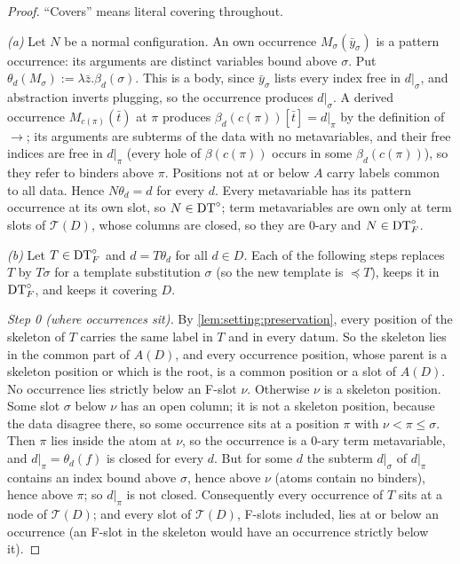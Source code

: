 \begin{proof}
``Covers'' means literal covering throughout.

\emph{(a)} Let $N$ be a normal configuration. An own occurrence $M_\sigma(\bar y_\sigma)$ is a pattern occurrence: its arguments are distinct variables bound above $\sigma$. Put $\theta_d(M_\sigma):=\lambda\bar z.\beta_d(\sigma)$. This is a body, since $\bar y_\sigma$ lists every index free in $d|_\sigma$, and abstraction inverts plugging, so the occurrence produces $d|_\sigma$. A derived occurrence $M_{c(\pi)}(\bar t)$ at $\pi$ produces $\beta_d(c(\pi))[\bar t]=d|_\pi$ by the definition of $\to$; its arguments are subterms of the data with no metavariables, and their free indices are free in $d|_\pi$ (every hole of $\beta(c(\pi))$ occurs in some $\beta_d(c(\pi))$), so they refer to binders above $\pi$. Positions not at or below $A$ carry labels common to all data. Hence $N\theta_d=d$ for every $d$. Every metavariable has its pattern occurrence at its own slot, so $N\in\mathrm{DT}^{\circ}$; term metavariables are own only at term slots of $\mathcal T(D)$, whose columns are closed, so they are $0$-ary and $N\in\mathrm{DT}^{\circ}_{F}$.

\emph{(b)} Let $T\in\mathrm{DT}^{\circ}_{F}$ and $d=T\theta_d$ for all $d\in D$. Each of the following steps replaces $T$ by $T\sigma$ for a template substitution $\sigma$ (so the new template is $\preceq T$), keeps it in $\mathrm{DT}^{\circ}_{F}$, and keeps it covering $D$.

\emph{Step 0 (where occurrences sit).} By \cref{lem:setting:preservation}, every position of the skeleton of $T$ carries the same label in $T$ and in every datum. So the skeleton lies in the common part of $A(D)$, and every occurrence position, whose parent is a skeleton position or which is the root, is a common position or a slot of $A(D)$. No occurrence lies strictly below an F-slot $\nu$. Otherwise $\nu$ is a skeleton position. Some slot $\sigma$ below $\nu$ has an open column; it is not a skeleton position, because the data disagree there, so some occurrence sits at a position $\pi$ with $\nu<\pi\le\sigma$. Then $\pi$ lies inside the atom at $\nu$, so the occurrence is a $0$-ary term metavariable, and $d|_\pi=\theta_d(f)$ is closed for every $d$. But for some $d$ the subterm $d|_\sigma$ of $d|_\pi$ contains an index bound above $\sigma$, hence above $\nu$ (atoms contain no binders), hence above $\pi$; so $d|_\pi$ is not closed. Consequently every occurrence of $T$ sits at a node of $\mathcal T(D)$; and every slot of $\mathcal T(D)$, F-slots included, lies at or below an occurrence (an F-slot in the skeleton would have an occurrence strictly below it).


\end{proof}
